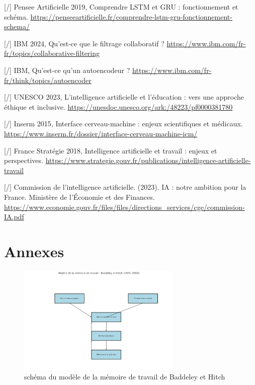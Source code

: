 \documentclass[11pt,a4paper]{report}
\begin{document}
\begin{thebibliography}{9}
        [/] Pensee Artificielle 2019, Comprendre LSTM et GRU : fonctionnement et schéma. \break
        \url{https://penseeartificielle.fr/comprendre-lstm-gru-fonctionnement-schema/}
    
        [/] IBM 2024, Qu'est-ce que le filtrage collaboratif ? \break
        \url{https://www.ibm.com/fr-fr/topics/collaborative-filtering}
    
        [/] IBM, Qu'est-ce qu'un autoencodeur ? \break
        \url{https://www.ibm.com/fr-fr/think/topics/autoencoder}
    
        [/] UNESCO 2023, L'intelligence artificielle et l'éducation : vers une approche éthique et inclusive. \break
        \url{https://unesdoc.unesco.org/ark:/48223/pf0000381780}
    
        [/] Inserm 2015, Interface cerveau-machine : enjeux scientifiques et médicaux. \break
        \url{https://www.inserm.fr/dossier/interface-cerveau-machine-icm/}

        [/] France Stratégie 2018, Intelligence artificielle et travail : enjeux et perspectives. \break
        \url{https://www.strategie.gouv.fr/publications/intelligence-artificielle-travail}
    
        [/] Commission de l’intelligence artificielle. (2023). IA : notre ambition pour la France. Ministère de l’Économie et des Finances. \break
        \url{https://www.economie.gouv.fr/files/files/directions_services/cge/commission-IA.pdf}

\end{thebibliography}

\chapter*{Annexes}

\begin{figure}[h]
    \centering
    \includegraphics[width=0.7\textwidth]{images/1.1.1_2.png}
    \caption{schéma du modèle de la mémoire de travail de Baddeley et Hitch}
    \label{fig:beth}
\end{figure}
\end{document}
